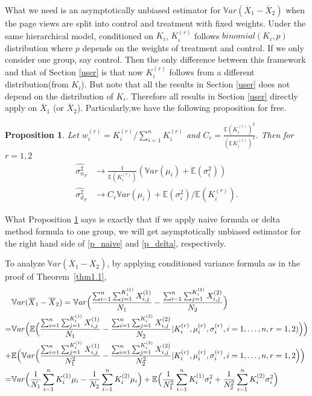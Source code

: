 \documentclass[11pt]{asaproc}
\newcommand{\wht}{\widehat}
\newcommand{\var}{\ensuremath{\mathbb Var}}
\newcommand{\bbe}{\mathbb{E}}
\newcommand{\xbar}{\overline{X}}
\newcommand{\naiveest}{\wht{\sigma^2_n}}
\newcommand{\deltaest}{\wht{\sigma^2_d}}
\newtheorem{prop}[thm]{Proposition}
\begin{document}
What we need is an asymptotically unbiased estimator for $\var (\xbar_1-\xbar_2)$ when the page views are split into control and treatment with fixed weights. Under the same hierarchical model, conditioned on $K_i$, $K_i^{(r)}$ follows $binomial(K_i, p)$ distribution where $p$ depends on the weights of treatment and control. If we only consider one group, say control. Then the only difference between this framework and that of Section \ref{user} is that now $K_i^{(r)}$ follows from a different distribution(from $K_i$). But note that all the results in Section \ref{user} does not depend on the distribution of $K_i$. Therefore all results in Section \ref{user} directly apply on $\xbar_1$ (or $\xbar_2$). Particularly,we have the following proposition for free.

\begin{prop}\label{p_prop1}
Let $w_i^{(r)}=K_i^{(r)}/\sum_{i=1}^{n} K_i^{(r)} $ and $C_r =\frac{\bbe (K_i^{(r)})^2}{(\bbe K_i^{(r)})^2}$. Then for $r=1,2$
\begin{align}
\naiveest_r &\to  \frac{1}{\bbe(K_i^{(r)})} (\var(\mu_i)+\bbe(\sigma_i^2)) \label{p_naive}\\
\deltaest_r &\to C_r \var(\mu_i) + \bbe(\sigma^2_i)/\bbe (K_i^{(r)}) \label{p_delta}.
\end{align}
\end{prop}

What Proposition \ref{p_prop1} says is exactly that if we apply naive formula or delta method formula to one group, we will get asymptotically unbiased estimator for the right hand side of \eqref{p_naive} and \eqref{p_delta}, respectively. 

To analyze $\var (\xbar_1-\xbar_2)$, by applying conditioned variance formula as in the proof of Theorem~\ref{thm1.1},
\begin{align}
&\var (\xbar_1-\xbar_2) = \var \Bigl( \frac{\sum_{i=1}^n\sum_{j=1}^{K_i^{(1)}} X_{i,j}^{(1)}}{N_1} -\frac{\sum_{i=1}^n\sum_{j=1}^{K_i^{(2)}} X_{i,j}^{(2)}}{N_2}\Bigr) \notag \\
 =& \var \Bigl( \bbe \Bigl( \frac{\sum_{i=1}^n\sum_{j=1}^{K_i^{(1)}} X_{i,j}^{(1)}}{N_1} -\frac{\sum_{i=1}^n\sum_{j=1}^{K_i^{(2)}} X_{i,j}^{(2)}}{N_2}|K_i^{(r)}, \mu_i^{(r)},\sigma_i^{(r)},i=1,\dots,n, r=1,2) \Bigr)\Bigr)\notag \\
+&\bbe \Bigl(\var \Bigl( \frac{\sum_{i=1}^n\sum_{j=1}^{K_i^{(1)}} X_{i,j}^{(1)}}{N_1^2} -\frac{\sum_{i=1}^n\sum_{j=1}^{K_i^{(2)}} X_{i,j}^{(2)}}{N_2^2}|K_i^{(r)}, \mu_i^{(r)},\sigma_i^{(r)},i=1,\dots,n, r=1,2\Bigr)\Bigr) \notag\\
=&\var \Bigl(\frac{1}{N_1}\sum_{i=1}^n K_i^{(1)} \mu_i  - \frac{1}{N_2}\sum_{i=1}^n K_i^{(2)} \mu_i\Bigr)+\bbe \Bigl(\frac{1}{N_1^2}\sum_{i=1}^n K_i^{(1)} \sigma^2_i   + \frac{1}{N_2^2}\sum_{i=1}^n K_i^{(2)} \sigma^2_i \Bigr)  \label{basicformula2}
\end{align}
\end{document}
